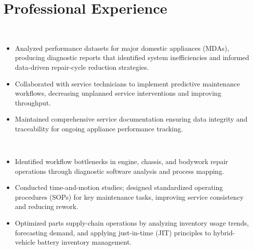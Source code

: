 \documentclass[10pt, letterpaper]{article}
\begin{document}
\newpage

\section{Professional Experience}

\\
\begin{itemize}
  \item Analyzed performance datasets for major domestic appliances (MDAs), producing diagnostic reports that identified system inefficiencies and informed data-driven repair-cycle reduction strategies.
  \item Collaborated with service technicians to implement predictive maintenance workflows, decreasing unplanned service interventions and improving throughput.
  \item Maintained comprehensive service documentation ensuring data integrity and traceability for ongoing appliance performance tracking.
\end{itemize}

\entrysep

\\
\begin{itemize}
  \item Identified workflow bottlenecks in engine, chassis, and bodywork repair operations through diagnostic software analysis and process mapping.
  \item Conducted time-and-motion studies; designed standardized operating procedures (SOPs) for key maintenance tasks, improving service consistency and reducing rework.
  \item Optimized parts supply-chain operations by analyzing inventory usage trends, forecasting demand, and applying just-in-time (JIT) principles to hybrid-vehicle battery inventory management.
\end{itemize}

\vspace{1pt}

\end{document}
